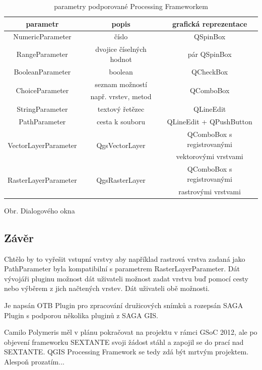\begin{table}	
	\centering
	\begin{tabular}{|c|c|c|}
		\hline
		\textbf{parametr} & \textbf{popis} & \textbf{grafická reprezentace}\\
		\hline
		\hline
		NumericParameter & číslo & QSpinBox\\
		\hline
		RangeParameter & dvojice číselných hodnot & pár QSpinBox\\	
		\hline
		BooleanParameter & boolean & QCheckBox\\		
		\hline
		\multirow{2}{*}{ChoiceParameter} & seznam možností & \multirow{2}{*}{QComboBox}\\
		& např. vrstev, metod & \\
		\hline
		StringParameter & textový řetězec & QLineEdit \\
		\hline
		PathParameter & cesta k souboru & QLineEdit + QPushButton \\
		\hline
		\multirow{2}{*}{VectorLayerParameter} & \multirow{2}{*}{QgsVectorLayer} & QComboBox s registrovanými \\
		& & vektorovými vrstvami\\
		\hline
		\multirow{2}{*}{RasterLayerParameter} & \multirow{2}{*}{QgsRasterLayer} & QComboBox s registrovanými \\
		& & rastrovými vrstvami\\		
		\hline	
	\end{tabular}
	\caption{parametry podporované Processing Frameworkem}
	\label{tab:pf_parametry}
\end{table}

Obr. Dialogového okna


\subsection{Závěr}

Chtělo by to vyřešit vstupní vrstvy aby například rastrová vrstva zadaná jako PathParameter byla kompatibilní s parametrem RasterLayerParameter. Dát vývojáři pluginu možnost dát uživateli možnost zadat vrstvu buď pomocí cesty nebo výběrem z jich načtených vrstev. Dát uživateli obě možnosti.

Je napsán OTB Plugin pro zpracování družicových snímků a rozepsán SAGA Plugin s podporou několika pluginů z SAGA GIS.

Camilo Polymeris měl v plánu pokračovat na projektu v rámci GSoC 2012, ale po objevení frameworku SEXTANTE svoji žádost stáhl a zapojil se do prací nad SEXTANTE. QGIS Processing Framework se tedy zdá být mrtvým projektem. Alespoň prozatím...
